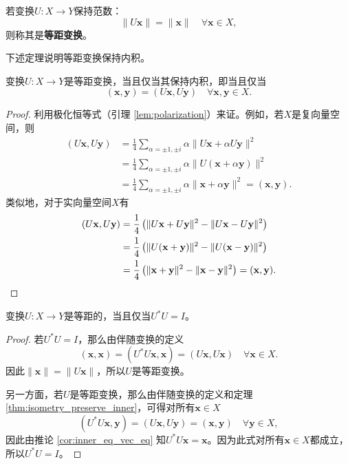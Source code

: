 \begin{definition*}
    若变换$U:X\to Y$保持范数：\[\|U\mathbf{x}\|=\|\mathbf{x}\|\quad\forall\mathbf{x}\in X,\]
    则称其是{\bf 等距变换}。
\end{definition*}

下述定理说明等距变换保持内积。

\begin{theorem}\label{thm:isometry_preserve_inner}
    变换$U:X\to Y$是等距变换，当且仅当其保持内积，即当且仅当\[(\mathbf{x},\mathbf{y})=(U\mathbf{x},U\mathbf{y})\quad\forall\mathbf{x},\mathbf{y}\in X.\]
\end{theorem}

\begin{proof}
    利用极化恒等式（引理 \ref{lem:polarization}）来证。例如，若$X$是复向量空间，则
    \[\begin{aligned}
        (U\mathbf{x},U\mathbf{y})&=\frac{1}{4}\sum_{\alpha=\pm1,\pm i}\alpha\|U\mathbf{x}+\alpha U\mathbf{y}\|^2\\
        &=\frac{1}{4}\sum_{\alpha=\pm1,\pm i}\alpha\|U(\mathbf{x}+\alpha\mathbf{y})\|^2\\
        &=\frac{1}{4}\sum_{\alpha=\pm1,\pm i}\alpha\|\mathbf{x}+\alpha\mathbf{y}\|^{2}=(\mathbf{x},\mathbf{y}).
    \end{aligned}\]
    类似地，对于实向量空间$X$有
    \begin{align*}
        (U\mathbf{x},U\mathbf{y})&=\frac{1}{4}\left(\|U\mathbf{x}+U\mathbf{y}\|^{2}-\|U\mathbf{x}-U\mathbf{y}\|^{2}\right)\\
        &=\frac{1}{4}\left(\|U(\mathbf{x}+\mathbf{y})\|^2-\|U(\mathbf{x}-\mathbf{y})\|^2\right)\\
        &=\frac{1}{4}\left(\|\mathbf{x}+\mathbf{y}\|^2-\|\mathbf{x}-\mathbf{y}\|^2\right)=(\mathbf{x},\mathbf{y}).\qedhere
    \end{align*}
\end{proof}

\begin{lemma}
    变换$U:X\to Y$是等距的，当且仅当$U^*U=I$。
\end{lemma}
\begin{proof}
    若$U^*U=I$，那么由伴随变换的定义
    \[(\mathbf{x},\mathbf{x})=(U^*U\mathbf{x},\mathbf{x})=(U\mathbf{x},U\mathbf{x})\quad\forall\mathbf{x}\in X.\]
    因此$\|\mathbf{x}\|=\|U\mathbf{x}\|$，所以$U$是等距变换。

    另一方面，若$U$是等距变换，那么由伴随变换的定义和定理 \ref{thm:isometry_preserve_inner}，可得对所有$\mathbf{x}\in X$
    \[(U^*U\mathbf{x},\mathbf{y})=(U\mathbf{x},U\mathbf{y})=(\mathbf{x},\mathbf{y})\quad\forall\mathbf{y}\in X,\]
    因此由推论 \ref{cor:inner_eq_vec_eq} 知$U^*U\mathbf{x}=\mathbf{x}$。因为此式对所有$\mathbf{x}\in X$都成立，所以$U^*U=I$。
\end{proof}

